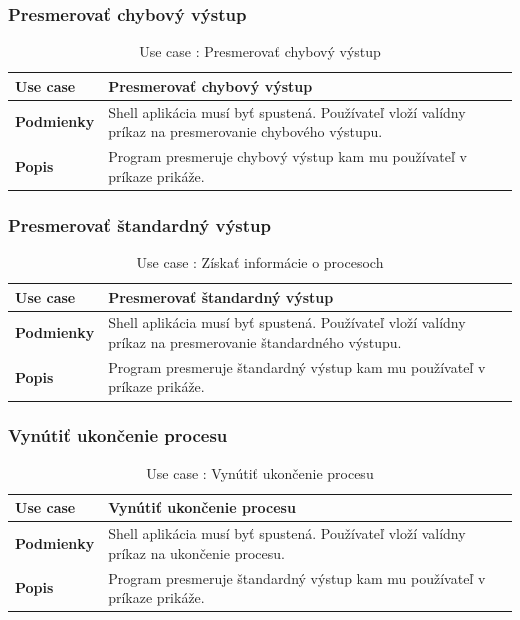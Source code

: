 \subsubsection{Presmerovať chybový výstup}
\begin{center}
	\begin{table}[htbp]
		\begin{tabular}{|p{2.5cm}|p{14cm}|}
			\hline
			\textbf{Use case} & Presmerovať chybový výstup \\ 
			\hline
			\textbf{Podmienky} & Shell aplikácia musí byť spustená. Používateľ vloží valídny príkaz na presmerovanie chybového výstupu. \\ 
			\hline
			\textbf{Popis} & Program presmeruje chybový výstup kam mu používateľ v príkaze prikáže. \\ 
			\hline
		\end{tabular}
		\label{table:1}
		\caption{Use case : Presmerovať chybový výstup}
	\end{table}
\end{center}
\subsubsection{Presmerovať štandardný výstup}
\begin{center}
	\begin{table}[htbp]
		\begin{tabular}{|p{2.5cm}|p{14cm}|}
			\hline
			\textbf{Use case} & Presmerovať štandardný výstup \\ 
			\hline
			\textbf{Podmienky} & Shell aplikácia musí byť spustená. Používateľ vloží valídny príkaz na presmerovanie štandardného výstupu. \\ 
			\hline
			\textbf{Popis} & Program presmeruje štandardný výstup kam mu používateľ v príkaze prikáže.\\ 
			\hline
		\end{tabular}
		\label{table:1}
		\caption{Use case : Získať informácie o procesoch}
	\end{table}
\end{center}
\subsubsection{Vynútiť ukončenie procesu}
\begin{center}
	\begin{table}[htbp]
		\begin{tabular}{|p{2.5cm}|p{14cm}|}
			\hline
			\textbf{Use case} & Vynútiť ukončenie procesu \\ 
			\hline
			\textbf{Podmienky} & Shell aplikácia musí byť spustená. Používateľ vloží valídny príkaz na ukončenie procesu. \\ 
			\hline
			\textbf{Popis} & Program presmeruje štandardný výstup kam mu používateľ v príkaze prikáže.\\ 
			\hline
		\end{tabular}
		\label{table:1}
		\caption{Use case : Vynútiť ukončenie procesu}
	\end{table}
\end{center}
\newpage
